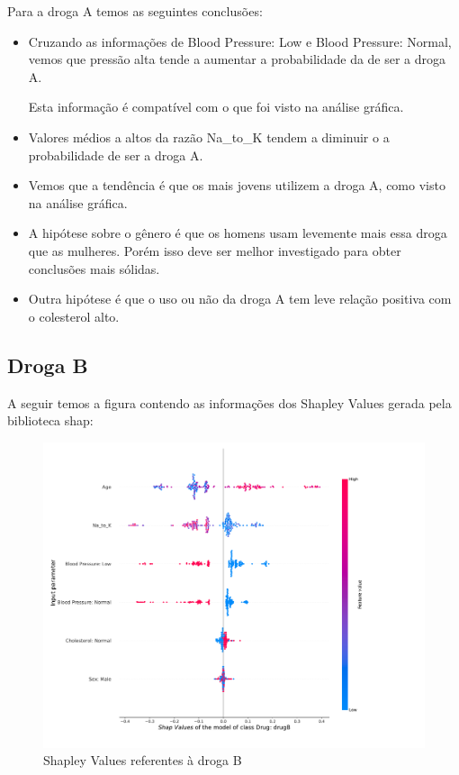 \documentclass[12pt,a4paper]{article}
\theoremstyle{definition}
\theoremstyle{theoremdd}
\begin{document}
Para a droga A temos as seguintes conclusões:

\begin{itemize}
\item Cruzando as informações de Blood Pressure: Low e Blood Pressure: Normal, vemos que pressão alta tende a aumentar a probabilidade da de ser a droga A.

Esta informação é compatível com o que foi visto na análise gráfica.

\item Valores médios a altos da razão Na\_to\_K tendem a diminuir o a probabilidade de ser a droga A.

\item Vemos que a tendência é que os mais jovens utilizem a droga A, como visto na análise gráfica.

\item A hipótese sobre o gênero é que os homens usam levemente mais essa droga que as mulheres. Porém isso deve ser melhor investigado para obter conclusões mais sólidas.

\item Outra hipótese é que o uso ou não da droga A tem leve relação positiva com o colesterol alto.
\end{itemize}


\subsection{Droga B}
A seguir temos a figura contendo as informações dos Shapley Values gerada pela biblioteca shap:
\begin{center}
\begin{figure}[H]
	\centering
	\includegraphics[scale=.40]{shap_drugB.pdf}
	\caption{Shapley Values referentes à droga B}
	\label{fig:05}
\end{figure}
\end{center}
\end{document}
